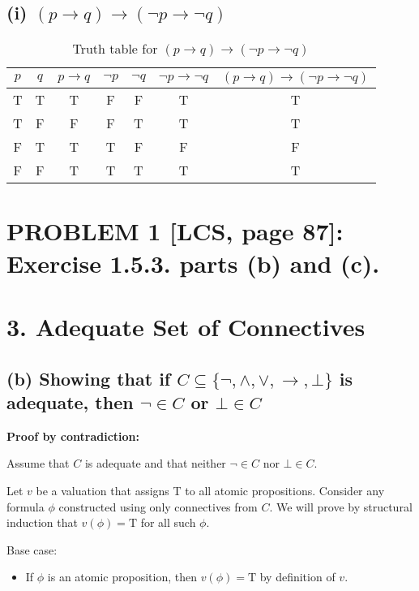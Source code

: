 \documentclass{article}
\begin{document}
\newpage
\subsection*{(i) $(p \rightarrow q) \rightarrow (\neg p \rightarrow \neg q)$}

\begin{table}[h]
\centering
\begin{tabular}{cc|cccc|c}
\toprule
$p$ & $q$ & $p \rightarrow q$ & $\neg p$ & $\neg q$ & $\neg p \rightarrow \neg q$ & $(p \rightarrow q) \rightarrow (\neg p \rightarrow \neg q)$ \\
\midrule
T & T & T & F & F & T & T \\
T & F & F & F & T & T & T \\
F & T & T & T & F & F & F \\
F & F & T & T & T & T & T \\
\bottomrule
\end{tabular}
\caption{Truth table for $(p \rightarrow q) \rightarrow (\neg p \rightarrow \neg q)$}
\end{table}


\medskip

\noindent

\newpage
\section*{PROBLEM 1 [LCS, page 87]: Exercise 1.5.3. parts (b) and (c).}

\section*{3. Adequate Set of Connectives}

\subsection*{(b) Showing that if $C \subseteq \{\neg, \wedge, \vee, \rightarrow, \bot\}$ is adequate, then $\neg \in C$ or $\bot \in C$}

\textbf{Proof by contradiction:}

Assume that $C$ is adequate and that neither $\neg \in C$ nor $\bot \in C$. 

Let $v$ be a valuation that assigns T to all atomic propositions. Consider any formula $\phi$ constructed using only connectives from $C$. We will prove by structural induction that $v(\phi) = \text{T}$ for all such $\phi$.

Base case: 
\begin{itemize}
    \item If $\phi$ is an atomic proposition, then $v(\phi) = \text{T}$ by definition of $v$.
\end{itemize}
\end{document}
